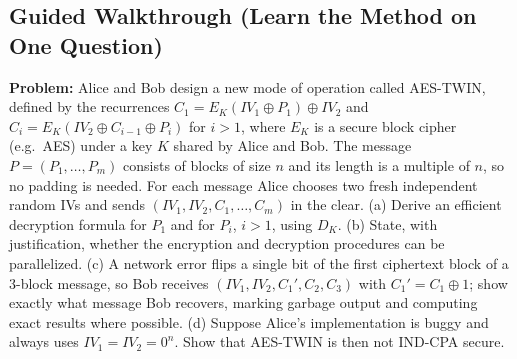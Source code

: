 \documentclass[12pt, a4paper]{article}
\begin{document}
\subsection*{Guided Walkthrough (Learn the Method on One Question)}
\textbf{Problem:} Alice and Bob design a new mode of operation called AES-TWIN, defined by the recurrences $C_1 = E_K(IV_1 \oplus P_1) \oplus IV_2$ and $C_i = E_K(IV_2 \oplus C_{i-1} \oplus P_i)$ for $i > 1$, where $E_K$ is a secure block cipher (e.g.\ AES) under a key $K$ shared by Alice and Bob. The message $P = (P_1, \dots, P_m)$ consists of blocks of size $n$ and its length is a multiple of $n$, so no padding is needed. For each message Alice chooses two fresh independent random IVs and sends $(IV_1, IV_2, C_1, \dots, C_m)$ in the clear. (a) Derive an efficient decryption formula for $P_1$ and for $P_i$, $i > 1$, using $D_K$. (b) State, with justification, whether the encryption and decryption procedures can be parallelized. (c) A network error flips a single bit of the first ciphertext block of a 3-block message, so Bob receives $(IV_1, IV_2, C_1', C_2, C_3)$ with $C_1' = C_1 \oplus 1$; show exactly what message Bob recovers, marking garbage output and computing exact results where possible. (d) Suppose Alice's implementation is buggy and always uses $IV_1 = IV_2 = 0^n$. Show that AES-TWIN is then not IND-CPA secure.
\end{document}
